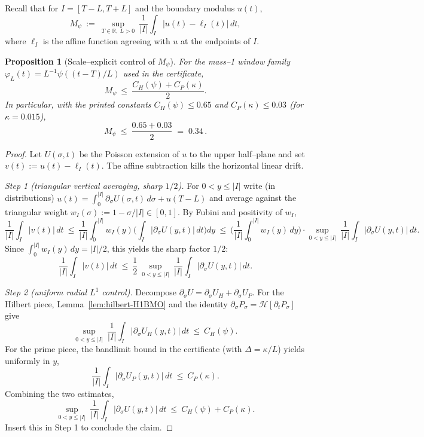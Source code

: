 \documentclass[11pt]{article}
\newtheorem{proposition}[theorem]{Proposition}
\theoremstyle{definition}
\theoremstyle{remark}
\newcommand{\R}{\mathbb{R}}
\begin{document}
Recall that for $I=[T{-}L,T{+}L]$ and the boundary modulus $u(t)$,
\[
  M_\psi\ :=\ \sup_{T\in\R,\ L>0}\ \frac{1}{|I|}\int_I\big|u(t)-\ell_I(t)\big|\,dt,
\]
where $\ell_I$ is the affine function agreeing with $u$ at the endpoints of $I$.

\begin{proposition}[Scale–explicit control of $M_\psi$]\label{prop:Mpsi-closed}
For the mass–1 window family $\varphi_L(t)=L^{-1}\psi((t-T)/L)$ used in the certificate,
\[
  M_\psi\ \le\ \frac{C_H(\psi)+C_P(\kappa)}{2}.
\]
In particular, with the printed constants $C_H(\psi)\le 0.65$ and $C_P(\kappa)\le 0.03$ (for $\kappa=0.015$),
\[
  M_\psi\ \le\ \frac{0.65+0.03}{2}\;=\;0.34\,.
\]
\end{proposition}

\begin{proof}
Let $U(\sigma,t)$ be the Poisson extension of $u$ to the upper half–plane and set $v(t):=u(t)-\ell_I(t)$. The affine subtraction kills the horizontal linear drift.

\emph{Step 1 (triangular vertical averaging, sharp $1/2$).} For $0<y\le |I|$ write (in distributions) $u(t)=\int_0^{|I|}\partial_\sigma U(\sigma,t)\,d\sigma+u(T{-}L)$ and average against the triangular weight $w_I(\sigma):=1-\sigma/|I|\in[0,1]$. By Fubini and positivity of $w_I$,
\[
  \frac{1}{|I|}\int_I |v(t)|\,dt
  \ \le\ \frac{1}{|I|}\int_0^{|I|}\!w_I(y)\Big(\int_I |\partial_\sigma U(y,t)|\,dt\Big)dy
  \ \le\ \Big(\frac{1}{|I|}\int_0^{|I|} w_I(y)\,dy\Big)\cdot\sup_{0<y\le |I|}\ \frac{1}{|I|}\int_I |\partial_\sigma U(y,t)|\,dt.
\]
Since $\int_0^{|I|} w_I(y)\,dy=|I|/2$, this yields the sharp factor $1/2$:
\[
  \frac{1}{|I|}\int_I |v(t)|\,dt\ \le\ \frac{1}{2}\ \sup_{0<y\le |I|}\ \frac{1}{|I|}\int_I |\partial_\sigma U(y,t)|\,dt.
\]

\emph{Step 2 (uniform radial $L^1$ control).} Decompose $\partial_\sigma U=\partial_\sigma U_H+\partial_\sigma U_P$. For the Hilbert piece, Lemma~\ref{lem:hilbert-H1BMO} and the identity $\partial_\sigma P_\sigma=\mathcal H[\partial_t P_\sigma]$ give
\[
  \sup_{0<y\le |I|}\ \frac{1}{|I|}\int_I |\partial_\sigma U_H(y,t)|\,dt\ \le\ C_H(\psi).
\]
For the prime piece, the bandlimit bound in the certificate (with $\Delta=\kappa/L$) yields uniformly in $y$,
\[
  \frac{1}{|I|}\int_I |\partial_\sigma U_P(y,t)|\,dt\ \le\ C_P(\kappa).
\]
Combining the two estimates,
\[
  \sup_{0<y\le |I|}\ \frac{1}{|I|}\int_I |\partial_\sigma U(y,t)|\,dt\ \le\ C_H(\psi)+C_P(\kappa).
\]
Insert this in Step 1 to conclude the claim.
\end{proof}
\end{document}
